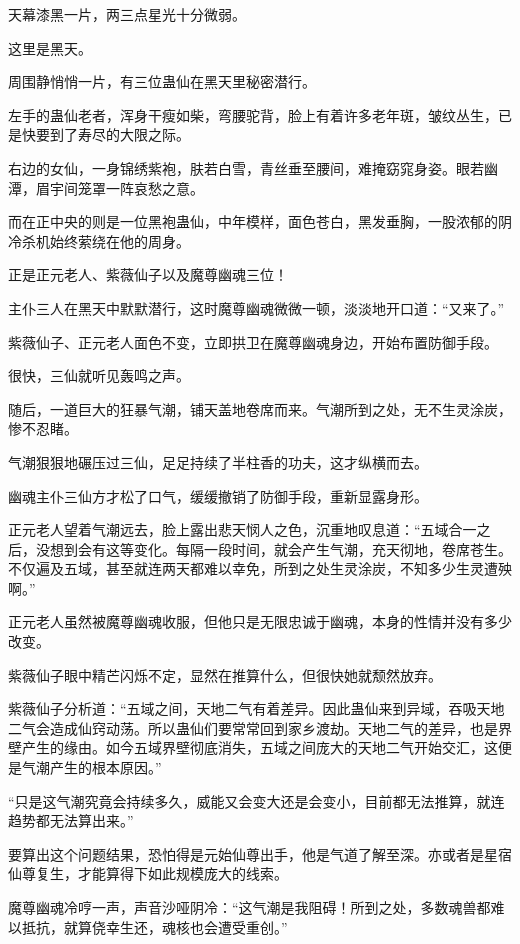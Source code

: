 
\begin{this_body}

天幕漆黑一片，两三点星光十分微弱。

这里是黑天。

周围静悄悄一片，有三位蛊仙在黑天里秘密潜行。

左手的蛊仙老者，浑身干瘦如柴，弯腰驼背，脸上有着许多老年斑，皱纹丛生，已是快要到了寿尽的大限之际。

右边的女仙，一身锦绣紫袍，肤若白雪，青丝垂至腰间，难掩窈窕身姿。眼若幽潭，眉宇间笼罩一阵哀愁之意。

而在正中央的则是一位黑袍蛊仙，中年模样，面色苍白，黑发垂胸，一股浓郁的阴冷杀机始终萦绕在他的周身。

正是正元老人、紫薇仙子以及魔尊幽魂三位！

主仆三人在黑天中默默潜行，这时魔尊幽魂微微一顿，淡淡地开口道：“又来了。”

紫薇仙子、正元老人面色不变，立即拱卫在魔尊幽魂身边，开始布置防御手段。

很快，三仙就听见轰鸣之声。

随后，一道巨大的狂暴气潮，铺天盖地卷席而来。气潮所到之处，无不生灵涂炭，惨不忍睹。

气潮狠狠地碾压过三仙，足足持续了半柱香的功夫，这才纵横而去。

幽魂主仆三仙方才松了口气，缓缓撤销了防御手段，重新显露身形。

正元老人望着气潮远去，脸上露出悲天悯人之色，沉重地叹息道：“五域合一之后，没想到会有这等变化。每隔一段时间，就会产生气潮，充天彻地，卷席苍生。不仅遍及五域，甚至就连两天都难以幸免，所到之处生灵涂炭，不知多少生灵遭殃啊。”

正元老人虽然被魔尊幽魂收服，但他只是无限忠诚于幽魂，本身的性情并没有多少改变。

紫薇仙子眼中精芒闪烁不定，显然在推算什么，但很快她就颓然放弃。

紫薇仙子分析道：“五域之间，天地二气有着差异。因此蛊仙来到异域，吞吸天地二气会造成仙窍动荡。所以蛊仙们要常常回到家乡渡劫。天地二气的差异，也是界壁产生的缘由。如今五域界壁彻底消失，五域之间庞大的天地二气开始交汇，这便是气潮产生的根本原因。”

“只是这气潮究竟会持续多久，威能又会变大还是会变小，目前都无法推算，就连趋势都无法算出来。”

要算出这个问题结果，恐怕得是元始仙尊出手，他是气道了解至深。亦或者是星宿仙尊复生，才能算得下如此规模庞大的线索。

魔尊幽魂冷哼一声，声音沙哑阴冷：“这气潮是我阻碍！所到之处，多数魂兽都难以抵抗，就算侥幸生还，魂核也会遭受重创。”


\end{this_body}
